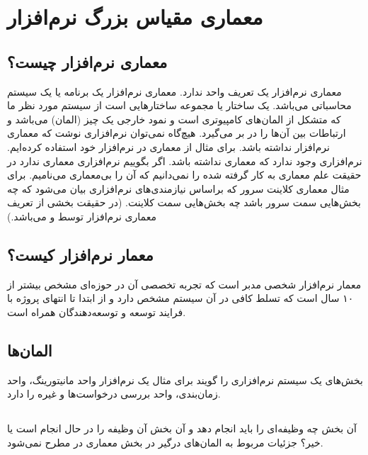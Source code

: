 \section{معماری مقیاس بزرگ نرم‌افزار}

\subsection{معماری نرم‌افزار چیست؟}

معماری نرم‌افزار یک تعریف واحد ندارد. معماری نرم‌افزار یک برنامه یا یک سیستم
محاسباتی می‌باشد. یک ساختار یا مجموعه ساختار‌هایی است از سیستم مورد نظر ما که
متشکل از المان‌های کامپیوتری است و نمود خارجی یک چیز (المان) می‌باشد و ارتباطات
بین آن‌ها را در بر می‌گیرد. هیچ‌گاه نمی‌توان نرم‌افزاری نوشت که معماری نرم‌افزار
نداشته باشد. برای مثال از معماری  در نرم‌افزار خود استفاده کرده‌ایم.
نرم‌افزاری وجود ندارد که معماری نداشته باشد. اگر بگوییم نرم‌افزاری معماری ندارد
در حقیقت علم معماری به کار گرفته شده را نمی‌دانیم که آن را بی‌معماری می‌نامیم.
برای مثال معماری کلاینت سرور که براساس نیازمندی‌های نرم‌افزاری بیان می‌شود که چه
بخش‌هایی سمت سرور باشد چه‌ بخش‌هایی سمت کلاینت. (در حقیقت بخشی از تعریف معماری
نرم‌افزار توسط  و  می‌باشد.)

\subsection{معمار نرم‌افزار کیست؟}

معمار نرم‌افزار شخصی مدبر است که تجربه تخصصی آن در حوزه‌ای مشخص بیشتر از ۱۰ سال
است که تسلط کافی در آن سیستم مشخص دارد و از ابتدا تا انتهای پروژه با فرایند
توسعه و توسعه‌دهندگان همراه است.

\subsection{المان‌ها}

بخش‌های یک سیستم نرم‌افزاری را گویند برای مثال یک نرم‌افزار واحد مانیتورینگ،
واحد زمان‌بندی، واحد بررسی درخواست‌ها و غیره را دارد.

\subsection{}

آن بخش چه وظیفه‌ای را باید انجام دهد و آن بخش آن وظیفه را در حال انجام است یا
خیر؟ جزئیات مربوط به المان‌های درگیر در بخش معماری در  مطرح نمی‌شود.


